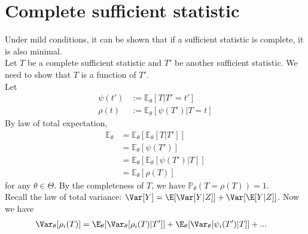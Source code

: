 
\section{Complete sufficient statistic}
Under mild conditions, it can be shown that if a sufficient statistic is complete, it is also minimal. \\

Let $T$ be a complete sufficient statistic and $T'$ be another sufficient statistic. We need to show that $T$ is a function of $T'$. \\

Let
\begin{align*}
    \psi(t') & := \mathbb{E}_\theta [T | T' = t']   \\
    \rho(t)  & := \mathbb{E}_\theta[\psi(T') | T=t]
\end{align*}
By law of total expectation,
\begin{align*}
    \mathbb{E}_\theta & = \mathbb{E}_\theta[\mathbb{E}_\theta[T|T']]       \\
                      & = \mathbb{E}_\theta[\psi(T')]                      \\
                      & = \mathbb{E}_\theta[\mathbb{E}_\theta[\psi(T')|T]] \\
                      & = \mathbb{E}_\theta[\rho(T)]
\end{align*}
for any $\theta \in \Theta$. By the completeness of $T$, we have $\mathbb{P}_\theta(T=\rho(T)) = 1$. \\

\noindent Recall the law of total variance: $\Var[Y] = \E[\Var[Y|Z]]+\Var[\E[Y|Z]]$. Now we have
\begin{align*}
    \Var_\theta[\rho_i(T)] & = \E_\theta[\Var_\theta[\rho_i(T)|T']] + \E_\theta[\Var_\theta[\psi_i(T')|T]] + ...
\end{align*}
